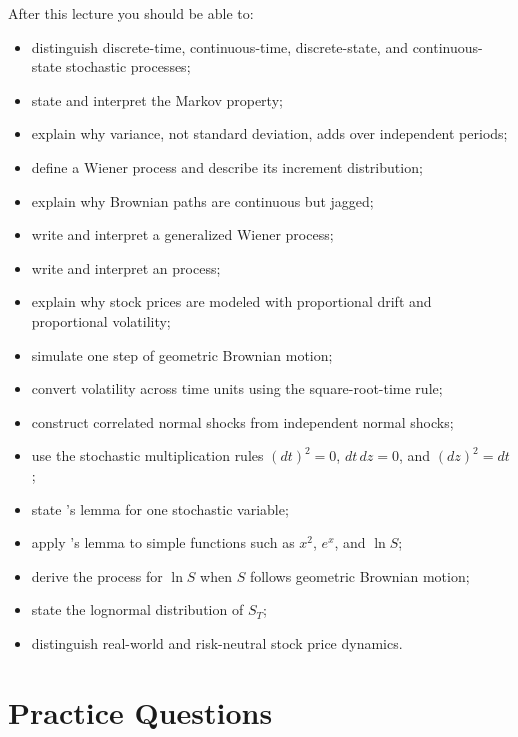 After this lecture you should be able to:
\begin{itemize}
    \item distinguish discrete-time, continuous-time, discrete-state, and
    continuous-state stochastic processes;
    \item state and interpret the Markov property;
    \item explain why variance, not standard deviation, adds over independent
    periods;
    \item define a Wiener process and describe its increment distribution;
    \item explain why Brownian paths are continuous but jagged;
    \item write and interpret a generalized Wiener process;
    \item write and interpret an \Ito process;
    \item explain why stock prices are modeled with proportional drift and
    proportional volatility;
    \item simulate one step of geometric Brownian motion;
    \item convert volatility across time units using the square-root-time rule;
    \item construct correlated normal shocks from independent normal shocks;
    \item use the stochastic multiplication rules $(dt)^2=0$, $dt\,dz=0$, and
    $(dz)^2=dt$;
    \item state \Ito's lemma for one stochastic variable;
    \item apply \Ito's lemma to simple functions such as $x^2$, $e^x$, and
    $\ln S$;
    \item derive the process for $\ln S$ when $S$ follows geometric Brownian
    motion;
    \item state the lognormal distribution of $S_T$;
    \item distinguish real-world and risk-neutral stock price dynamics.
\end{itemize}

\section{Practice Questions}

